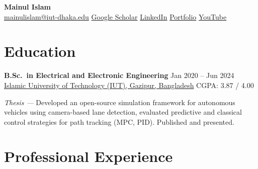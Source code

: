 \documentclass[10pt]{article}
\begin{document}
\begin{center}
    {\LARGE\bfseries Mainul Islam}\\[3pt]
    \href{mailto:mainulislam@iut-dhaka.edu}{mainulislam@iut-dhaka.edu} \;\textbar\;
    \href{https://scholar.google.com/citations?user=mHfGHugAAAAJ\&hl=en}{Google Scholar} \;\textbar\;
    \href{https://www.linkedin.com/in/mainul-islam-254071205/}{LinkedIn} \;\textbar\;
    \href{https://mainul-islam-07.github.io/mainulislam.github.io/}{Portfolio} \;\textbar\;
    \href{https://www.youtube.com/@mainulislamefan}{YouTube}
\end{center}

\section*{Education}
\textbf{B.Sc.\ in Electrical and Electronic Engineering} \hfill Jan 2020 -- Jun 2024\\
\href{https://www.iutoic-dhaka.edu/}{Islamic University of Technology (IUT), Gazipur, Bangladesh}
\hfill CGPA: 3.87 / 4.00

\smallskip
\textit{Thesis ---} Developed an open-source simulation framework for autonomous vehicles
using camera-based lane detection, evaluated predictive and classical control strategies for
path tracking (MPC, PID). Published and presented.

\section*{Professional Experience}
\end{document}
